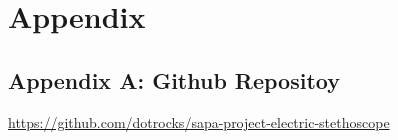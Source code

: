 \documentclass[
	12pt,twoside,a4paper
]{report}
\begin{document}

\tableofcontents






\newpage
\thispagestyle{plain}

\chapter*{Appendix}

\section*{Appendix A: Github Repositoy}\label{sec:appendix_a}
\url{https://github.com/dotrocks/sapa-project-electric-stethoscope}

\printbibliography{}
\end{document}
